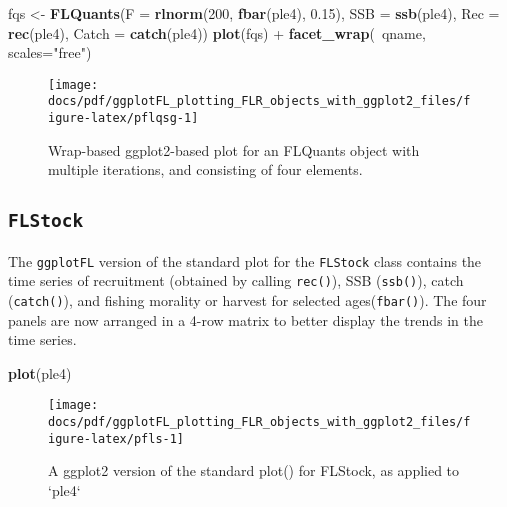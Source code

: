 \documentclass[]{article}
\newenvironment{Shaded}{\begin{snugshade}}{\end{snugshade}}
\newcommand{\KeywordTok}[1]{\textcolor[rgb]{0.13,0.29,0.53}{\textbf{{#1}}}}
\newcommand{\DataTypeTok}[1]{\textcolor[rgb]{0.13,0.29,0.53}{{#1}}}
\newcommand{\DecValTok}[1]{\textcolor[rgb]{0.00,0.00,0.81}{{#1}}}
\newcommand{\FloatTok}[1]{\textcolor[rgb]{0.00,0.00,0.81}{{#1}}}
\newcommand{\StringTok}[1]{\textcolor[rgb]{0.31,0.60,0.02}{{#1}}}
\newcommand{\NormalTok}[1]{{#1}}
\begin{document}
\begin{Shaded}
\begin{Highlighting}[]
\NormalTok{fqs <-}\StringTok{ }\KeywordTok{FLQuants}\NormalTok{(}\DataTypeTok{F =} \KeywordTok{rlnorm}\NormalTok{(}\DecValTok{200}\NormalTok{, }\KeywordTok{fbar}\NormalTok{(ple4), }\FloatTok{0.15}\NormalTok{), }\DataTypeTok{SSB =} \KeywordTok{ssb}\NormalTok{(ple4), }\DataTypeTok{Rec =} \KeywordTok{rec}\NormalTok{(ple4), }\DataTypeTok{Catch =} \KeywordTok{catch}\NormalTok{(ple4))}
\KeywordTok{plot}\NormalTok{(fqs) +}\StringTok{ }\KeywordTok{facet_wrap}\NormalTok{(~qname, }\DataTypeTok{scales=}\StringTok{"free"}\NormalTok{)}
\end{Highlighting}
\end{Shaded}

\begin{figure}

{\centering \texttt{[image: docs/pdf/ggplotFL\_plotting\_FLR\_objects\_with\_ggplot2\_files/figure-latex/pflqsg-1]} 

}

\caption{Wrap-based ggplot2-based plot for an FLQuants object with multiple iterations, and consisting of four elements.}\label{fig:pflqsg}
\end{figure}

\subsection{\texorpdfstring{\texttt{FLStock}}{FLStock}}\label{flstock-1}

The \texttt{ggplotFL} version of the standard plot for the
\texttt{FLStock} class contains the time series of recruitment (obtained
by calling \texttt{rec()}), SSB (\texttt{ssb()}), catch
(\texttt{catch()}), and fishing morality or harvest for selected
ages(\texttt{fbar()}). The four panels are now arranged in a 4-row
matrix to better display the trends in the time series.

\begin{Shaded}
\begin{Highlighting}[]
\KeywordTok{plot}\NormalTok{(ple4)}
\end{Highlighting}
\end{Shaded}

\begin{figure}

{\centering \texttt{[image: docs/pdf/ggplotFL\_plotting\_FLR\_objects\_with\_ggplot2\_files/figure-latex/pfls-1]} 

}

\caption{A ggplot2 version of the standard plot() for FLStock, as applied to `ple4`}\label{fig:pfls}
\end{figure}
\end{document}
